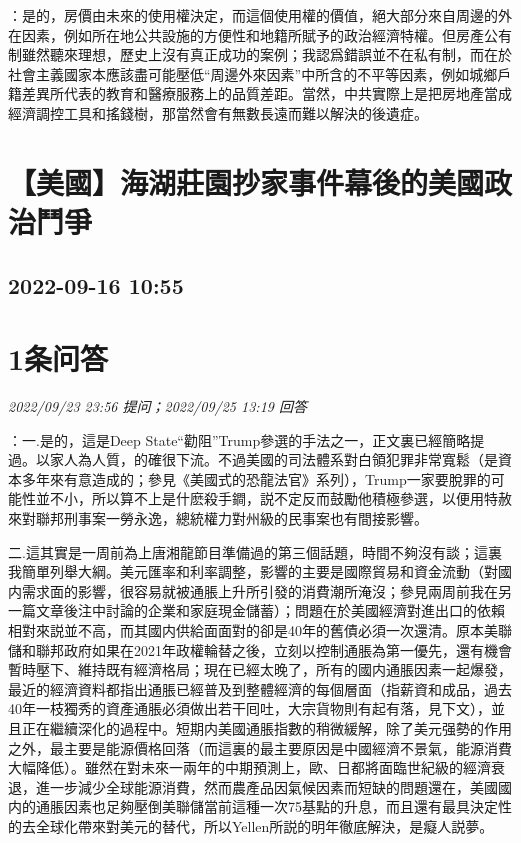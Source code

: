 \documentclass[twocolumn]{ctexart}
\begin{document}
：是的，房價由未來的使用權決定，而這個使用權的價值，絕大部分來自周邊的外在因素，例如所在地公共設施的方便性和地籍所賦予的政治經濟特權。但房產公有制雖然聽來理想，歷史上沒有真正成功的案例；我認爲錯誤並不在私有制，而在於社會主義國家本應該盡可能壓低“周邊外來因素”中所含的不平等因素，例如城鄉戶籍差異所代表的教育和醫療服務上的品質差距。當然，中共實際上是把房地產當成經濟調控工具和搖錢樹，那當然會有無數長遠而難以解決的後遺症。
\\


\section{【美國】海湖莊園抄家事件幕後的美國政治鬥爭}
\subsection{2022-09-16 10:55}


\section{1条问答}

\textit{\hfill\noindent\small 2022/09/23 23:56 提问；2022/09/25 13:19 回答}

：一.是的，這是Deep State“勸阻”Trump參選的手法之一，正文裏已經簡略提過。以家人為人質，的確很下流。不過美國的司法體系對白領犯罪非常寬鬆（是資本多年來有意造成的；參見《美國式的恐龍法官》系列），Trump一家要脫罪的可能性並不小，所以算不上是什麽殺手鐧，説不定反而鼓勵他積極參選，以便用特赦來對聯邦刑事案一勞永逸，總統權力對州級的民事案也有間接影響。

二.這其實是一周前為上唐湘龍節目準備過的第三個話題，時間不夠沒有談；這裏我簡單列舉大綱。美元匯率和利率調整，影響的主要是國際貿易和資金流動（對國内需求面的影響，很容易就被通脹上升所引發的消費潮所淹沒；參見兩周前我在另一篇文章後注中討論的企業和家庭現金儲蓄）；問題在於美國經濟對進出口的依賴相對來説並不高，而其國内供給面面對的卻是40年的舊債必須一次還清。原本美聯儲和聯邦政府如果在2021年政權輪替之後，立刻以控制通脹為第一優先，還有機會暫時壓下、維持既有經濟格局；現在已經太晚了，所有的國内通脹因素一起爆發，最近的經濟資料都指出通脹已經普及到整體經濟的每個層面（指薪資和成品，過去40年一枝獨秀的資產通脹必須做出若干囘吐，大宗貨物則有起有落，見下文），並且正在繼續深化的過程中。短期内美國通脹指數的稍微緩解，除了美元强勢的作用之外，最主要是能源價格回落（而這裏的最主要原因是中國經濟不景氣，能源消費大幅降低）。雖然在對未來一兩年的中期預測上，歐、日都將面臨世紀級的經濟衰退，進一步減少全球能源消費，然而農產品因氣候因素而短缺的問題還在，美國國内的通脹因素也足夠壓倒美聯儲當前這種一次75基點的升息，而且還有最具決定性的去全球化帶來對美元的替代，所以Yellen所説的明年徹底解決，是癡人説夢。
\end{document}
